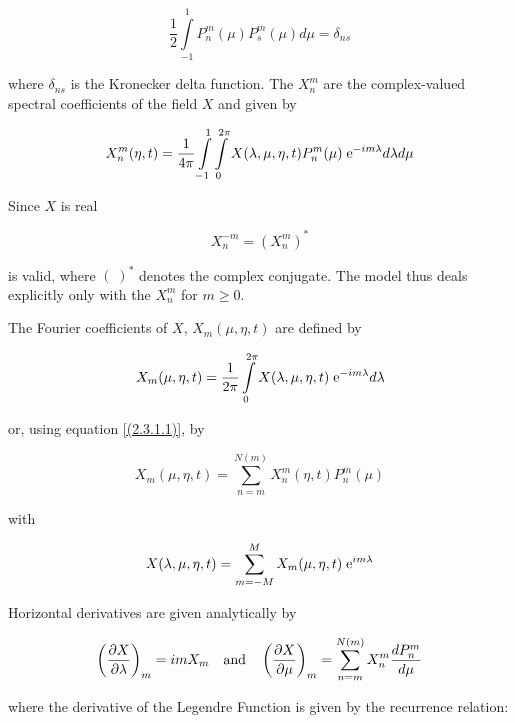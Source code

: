 \begin{equation}
\frac{1}{2} \int\limits_{-1}^1 P_n^m(\mu)P_s^m(\mu) d\mu = \delta_{ns}
\label{(2.3.1.3)}
\end{equation}

where $\delta_{ns}$ is the Kronecker delta function. The $X_n^m$ are
the complex-valued spectral coefficients of the field $X$ and given by

\begin{equation}
X_n^m(\eta,t) = \frac{1}{4\pi}\int\limits_{-1}^1\int\limits_0^{2\pi}
X(\lambda,\mu,\eta,t) P_n^m(\mu) \;\mbox{e}^{-im\lambda} d\lambda d\mu
\label{(2.3.1.4)} 
\end{equation}

Since $X$ is real

\begin{equation}
X_n^{-m} = (X_n^m)^*
\label{(2.3.1.5)}
\end{equation}

is valid, where $(\;)^*$ denotes the complex conjugate. The model thus
deals explicitly only with the $X_n^m$ for $m \ge 0$. 

The Fourier coefficients of $X$, $X_m(\mu,\eta,t)$ are defined by

\begin{equation}
X_m(\mu,\eta,t) = \frac{1}{2\pi}\int\limits_0^{2\pi}
X(\lambda,\mu,\eta,t)\;\mbox{e}^{-im\lambda} d\lambda
\label{(2.3.1.6)} 
\end{equation}

or, using equation \ref{(2.3.1.1)}, by

\begin{equation}
X_m(\mu,\eta,t) = \sum\limits_{n=m}^{N(m)} X_n^m(\eta,t) P_n^m(\mu)
\label{(2.3.1.7)}
\end{equation}

with

\begin{equation}
X(\lambda,\mu,\eta,t) = \sum\limits_{m = -M}^M 
X_m(\mu,\eta,t) \;\mbox{e}^{im\lambda}
\label{(2.3.1.8)} 
\end{equation}

Horizontal derivatives are given analytically by

\begin{equation}
\left(\frac {\partial X} {\partial \lambda}\right)_m = imX_m
\quad \mbox{and} \quad
\left(\frac {\partial X} {\partial \mu}\right)_m = \sum\limits_{n=m}^{N(m)} X_n^m 
\frac{dP_n^m}{d\mu}
\label{(2.3.1.9)}
\end{equation}

where the derivative of the Legendre Function is given by
the recurrence relation:

